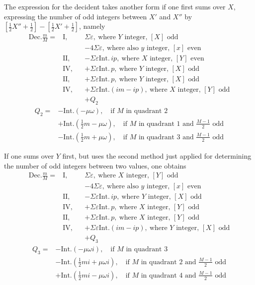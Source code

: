 The expression for the decident takes another form if one first sums over $X$, expressing the number of odd integers between $X'$ and $X''$ by $[\tfrac12X''+\tfrac12]-[\tfrac12X'+\tfrac12]$, namely
\[
\begin{aligned}
\mathrm{Dec.}\frac mM={}&\mathrm{I},& &\Sigma\varepsilon,\ \text{where }Y\text{ integer, }[X]\text{ odd}\\
&&&-4\Sigma\varepsilon,\ \text{where also }y\text{ integer, }[x]\text{ even}\\
&\mathrm{II},&&-\Sigma\varepsilon\mathrm{Int.}\,ip,\ \text{where }X\text{ integer, }[Y]\text{ even}\\
&\mathrm{IV},&&+\Sigma\varepsilon\mathrm{Int.}\,p,\ \text{where }Y\text{ integer, }[X]\text{ odd}\\
&\mathrm{II},&&+\Sigma\varepsilon\mathrm{Int.}\,p,\ \text{where }Y\text{ integer, }[X]\text{ odd}\\
&\mathrm{IV},&&+\Sigma\varepsilon\mathrm{Int.}(im-ip),\ \text{where }X\text{ integer, }[Y]\text{ odd}\\
&&&+Q_2
\end{aligned}
\]
\[
\begin{aligned}
Q_2={}&-\mathrm{Int.}(-\mu\omega),\quad\text{if }M\text{ in quadrant }2\text{}\\
&+\mathrm{Int.}(\tfrac12m-\mu\omega),\quad\text{if }M\text{ in quadrant }1\text{ and }\frac{M-1}{2}\text{ odd}\\
&-\mathrm{Int.}(\tfrac12m+\mu\omega),\quad\text{if }M\text{ in quadrant }3\text{ and }\frac{M-1}{2}\text{ odd}
\end{aligned}
\]

If one sums over $Y$ first, but uses the second method just applied for determining the number of odd integers between two values, one obtains
\[
\begin{aligned}
\mathrm{Dec.}\frac mM={}&\mathrm{I},& &\Sigma\varepsilon,\ \text{where }X\text{ integer, }[Y]\text{ odd}\\
&&&-4\Sigma\varepsilon,\ \text{where also }y\text{ integer, }[x]\text{ even}\\
&\mathrm{II},&&-\Sigma\varepsilon\mathrm{Int.}\,ip,\ \text{where }Y\text{ integer, }[X]\text{ odd}\\
&\mathrm{IV},&&+\Sigma\varepsilon\mathrm{Int.}\,p,\ \text{where }X\text{ integer, }[Y]\text{ odd}\\
&\mathrm{II},&&+\Sigma\varepsilon\mathrm{Int.}\,p,\ \text{where }X\text{ integer, }[Y]\text{ odd}\\
&\mathrm{IV},&&+\Sigma\varepsilon\mathrm{Int.}(im-ip),\ \text{where }Y\text{ integer, }[X]\text{ odd}\\
&&&+Q_3
\end{aligned}
\]
\[
\begin{aligned}
Q_3={}&-\mathrm{Int.}(-\mu\omega i),\quad\text{if }M\text{ in quadrant }3\text{}\\
&-\mathrm{Int.}(\tfrac12mi+\mu\omega i),\quad\text{if }M\text{ in quadrant }2\text{ and }\frac{M-1}{2}\text{ odd}\\
&+\mathrm{Int.}(\tfrac12mi-\mu\omega i),\quad\text{if }M\text{ in quadrant }4\text{ and }\frac{M-1}{2}\text{ odd}
\end{aligned}
\]

